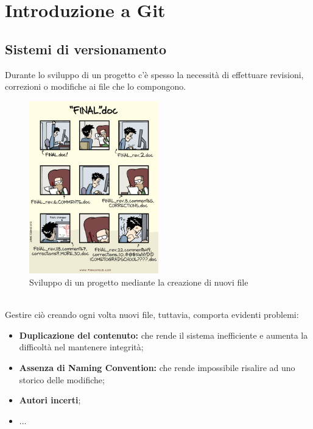 \documentclass[12pt]{article}
\begin{document}
    \newpage
    \section{Introduzione a Git}
    \subsection{Sistemi di versionamento}
    Durante lo sviluppo di un progetto c'è spesso la necessità di effettuare revisioni, correzioni o modifiche ai file che lo compongono.
    \begin{figure}[h]
        \centering
        \includegraphics[width=0.5\textwidth]{introduzione_a_git/no_git_example.png}
        \caption{Sviluppo di un progetto mediante la creazione di nuovi file}
    \end{figure}\\
    Gestire ciò creando ogni volta nuovi file, tuttavia, comporta evidenti problemi:
    \begin{itemize}
      \item \textbf{Duplicazione del contenuto:} che rende il sistema inefficiente e aumenta la difficoltà nel mantenere integrità;
      \item \textbf{Assenza di Naming Convention:} che rende impossibile risalire ad uno storico delle modifiche;
      \item \textbf{Autori incerti};
      \item ...
    \end{itemize}
\end{document}
